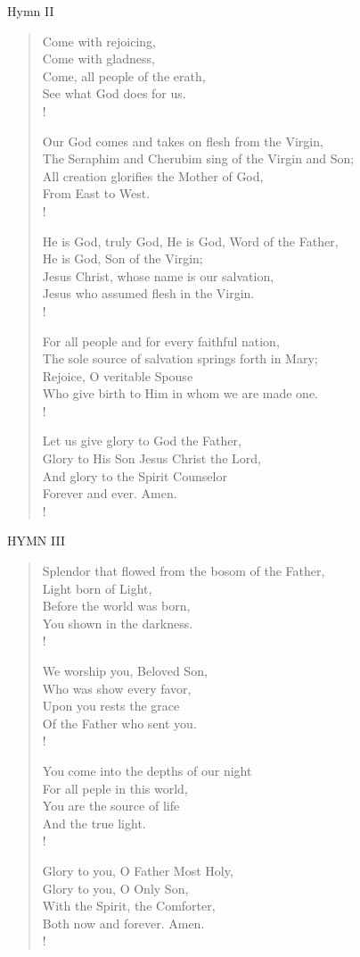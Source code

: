 Hymn II
\begin{verse}
Come with rejoicing,\\
Come with gladness,\\
Come, all people of the erath,\\
See what God does for us.\\!

Our God comes and takes on flesh from the Virgin,\\
The Seraphim and Cherubim sing of the Virgin and Son;\\
All creation glorifies the Mother of God,\\
From East to West.\\!

He is God, truly  God, He is God, Word of the Father,\\
He is God, Son of the Virgin;\\
Jesus Christ, whose name is our salvation,\\
Jesus who assumed flesh in the Virgin.\\!

For all people and for every faithful nation,\\
The sole source of salvation springs forth in Mary;\\
Rejoice, O veritable Spouse\\
Who give birth to Him in whom we are made one.\\!

Let us give glory to God the Father,\\
Glory to His Son Jesus Christ the Lord,\\
And glory to the Spirit Counselor\\
Forever and ever. Amen.\\!
\end{verse}

\noindent\small{\uppercase{Hymn III }}\normalsize\label{christmas:lastHymn}
\begin{verse}
Splendor that flowed from the bosom of the Father,\\
Light born of Light,\\
Before the world was born,\\
You shown in the darkness.\\!

We worship you, Beloved Son,\\
Who was show every favor,\\
Upon you rests the grace\\
Of the Father who sent you.\\!

You come into the depths of our night\\
For all peple in this world,\\
You are the source of life\\
And the true light.\\!

Glory to you, O Father Most Holy,\\
Glory to you, O Only Son,\\
With the Spirit, the Comforter,\\
Both now and forever. Amen.\\!
\end{verse}

